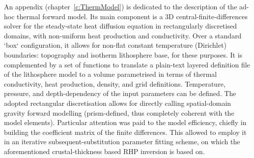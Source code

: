 An appendix (chapter~\ref{c:ThermModel}) is dedicated to the description of the ad-hoc thermal forward model.
Its main component is a 3D central-finite-differences solver for the steady-state heat diffusion equation in rectangularly discretised domains, with non-uniform heat production and conductivity.
Over a standard `box` configuration, it allows for non-flat constant temperature (Dirichlet) boundaries: topography and isotherm lithosphere base, for these purposes.
It is complemented by a set of functions to translate a plain-text layered definition file of the lithosphere model to a volume parametrised in terms of thermal conductivity, heat production, density, and grid definitions.
Temperature, pressure, and depth-dependency of the input parameters can be defined.
The adopted rectangular discretisation allows for directly calling spatial-domain gravity forward modelling (prism-defined, thus completely coherent with the model elements).
Particular attention was paid to the model efficiency, chiefly in building the coefficient matrix of the finite differences.
This allowed to employ it in an iterative subsequent-substitution parameter fitting scheme, on which the aforementioned crustal-thickness based RHP inversion is based on.

\nocite{Pastorutti2019}
